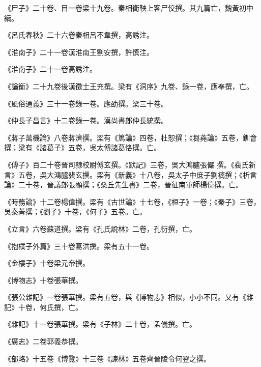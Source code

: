 \begin{pinyinscope}
 《尸子》二十卷、目一卷梁十九卷。秦相衛鞅上客尸佼撰。其九篇亡，魏黃初中續。



 《呂氏春秋》二十六卷秦相呂不韋撰，高誘注。



 《淮南子》二十一卷漢淮南王劉安撰，許慎注。



 《淮南子》二十一卷高誘注。



 《論衡》二十九卷後漢徵士王充撰。梁有《洞序》九卷、錄一卷，應奉撰，亡。



 《風俗通義》三十一卷錄一卷。應劭撰。梁三十卷。



 《仲長子昌言》十二卷錄一卷。漢尚書郎仲長統撰。



 《蔣子萬機論》八卷蔣濟撰。梁有《篤論》四卷，杜恕撰；《芻蕘論》五卷，釧會撰；梁有《諸葛子》五卷，吳太傅諸葛恪撰。亡。



 《傅子》百二十卷晉司隸校尉傅玄撰。《默記》三卷，吳大鴻臚張儼
 撰。《裴氏新言》五卷，吳大鴻臚裴玄撰。梁有《新義》十八卷，吳太子中庶子劉褵撰；《析言論》二十卷，晉議郎張顯撰；《桑丘先生書》二卷，晉征南軍師楊偉撰。亡。



 《時務論》十二卷楊偉撰。梁有《古世論》十七卷，《桓子》一卷；《秦子》三卷，吳秦菁撰；《劉子》十卷，《何子》五卷。亡。



 《立言》六卷蘇道撰。梁有《孔氏說林》二卷，孔衍撰，亡。



 《抱樸子外篇》三十卷葛洪撰。梁有五十一卷。



 《金樓子》十卷梁元帝撰。



 《博物志》十卷張華撰。



 《張公雜記》一卷張華撰。梁有五卷，與《博物志》相似，小小不同。又有《雜記》十卷，何氏撰，亡。



 《雜記》十一卷張華撰。梁有《子林》二十卷，孟儀撰。亡。



 《廣志》二卷郭義恭撰。



 《部略》十五卷《博覽》十三卷《諫林》五卷齊晉陵令何翌之撰。




\end{pinyinscope}
